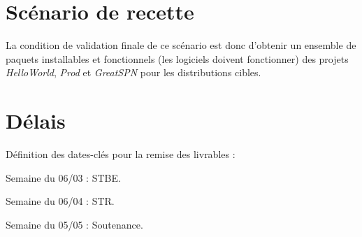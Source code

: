 \documentclass[12pt,a4paper]{article}
\begin{document}
\section{Scénario de recette}

La condition de validation finale de ce scénario est donc d'obtenir un ensemble de paquets installables et fonctionnels (les logiciels doivent fonctionner) des projets \textit{HelloWorld}, \textit{Prod} et \textit{GreatSPN} pour les distributions cibles.

\section{Délais}

Définition des dates-clés pour la remise des livrables :

Semaine du 06/03 : STBE.

Semaine du 06/04 : STR.

Semaine du 05/05 : Soutenance.
\end{document}
